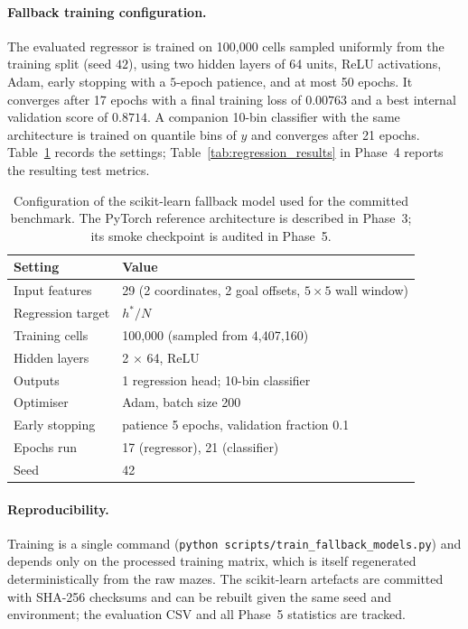 \paragraph{Fallback training configuration.}
The evaluated regressor is trained on 100{,}000 cells sampled uniformly from the training
split (seed $42$), using two hidden layers of 64 units, ReLU activations, Adam, early
stopping with a $5$-epoch patience, and at most 50 epochs. It converges after 17 epochs
with a final training loss of $0.00763$ and a best internal validation score of $0.8714$.
A companion 10-bin classifier with the same architecture is trained on quantile bins of
$y$ and converges after 21 epochs. Table~\ref{tab:fallback_config} records the settings;
Table~\ref{tab:regression_results} in Phase~4 reports the resulting test metrics.

\begin{table}[H]
\centering
\small
\begin{tabular}{ll}
\toprule
\textbf{Setting} & \textbf{Value} \\
\midrule
Input features & 29 (2 coordinates, 2 goal offsets, $5\times5$ wall window) \\
Regression target & $h^\ast/N$ \\
Training cells & 100{,}000 (sampled from 4{,}407{,}160) \\
Hidden layers & 2 $\times$ 64, ReLU \\
Outputs & 1 regression head; 10-bin classifier \\
Optimiser & Adam, batch size 200 \\
Early stopping & patience 5 epochs, validation fraction 0.1 \\
Epochs run & 17 (regressor), 21 (classifier) \\
Seed & 42 \\
\bottomrule
\end{tabular}
\caption{Configuration of the scikit-learn fallback model used for the committed
benchmark. The PyTorch reference architecture is described in Phase~3; its smoke
checkpoint is audited in Phase~5.}
\label{tab:fallback_config}
\end{table}

\paragraph{Reproducibility.}
Training is a single command (\texttt{python scripts/train\_fallback\_models.py}) and
depends only on the processed training matrix, which is itself regenerated
deterministically from the raw mazes. The scikit-learn artefacts are committed with
SHA-256 checksums and can be rebuilt given the same seed and environment; the evaluation
CSV and all Phase~5 statistics are tracked.
